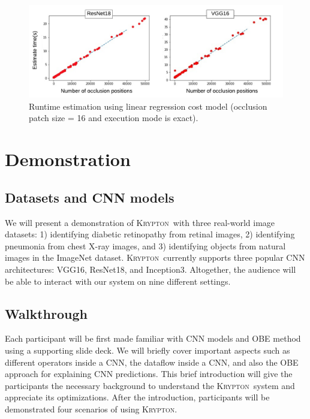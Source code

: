 \documentclass{vldb}
\newcommand{\system}{\textsc{Krypton}}
\begin{document}
\begin{figure}
\includegraphics[width=\columnwidth]{images/runtime_estimation.pdf}
\vspace{-2mm}
\caption{Runtime estimation using linear regression cost model (occlusion patch size = 16 and execution mode is exact).}
\label{fig:runtime_estimation}
\vspace{-2mm}
\end{figure}


\section{Demonstration}\label{demonstration}
\vspace{-2mm}
\subsection{Datasets and CNN models}
We will present a demonstration of \system ~with three real-world image datasets: 1) identifying diabetic retinopathy from retinal images, 2) identifying pneumonia from chest X-ray images, and 3) identifying objects from natural images in the ImageNet dataset.
\system~currently supports three popular CNN architectures: VGG16, ResNet18, and Inception3. Altogether, the audience will be able to interact with our system on nine different settings.


\subsection{Walkthrough}
Each participant will be first made familiar with CNN models and OBE method using a supporting slide deck.
We will briefly cover important aspects such as different operators inside a CNN, the dataflow inside a CNN, and also the OBE approach for explaining CNN predictions.
This brief introduction will give the participants the necessary background to understand the \system~system and appreciate its optimizations.
After the introduction, participants will be demonstrated four scenarios of using \system.
\end{document}
